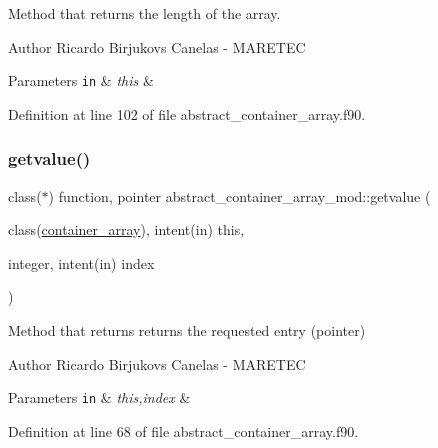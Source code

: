 Method that returns the length of the array. 

\begin{DoxyAuthor}{Author}
Ricardo Birjukovs Canelas -\/ M\+A\+R\+E\+T\+EC 
\end{DoxyAuthor}

\begin{DoxyParams}[1]{Parameters}
\mbox{\tt in}  & {\em this} & \\
\hline
\end{DoxyParams}


Definition at line 102 of file abstract\+\_\+container\+\_\+array.\+f90.

\mbox{\label{namespaceabstract__container__array__mod_a2b3e0aec504d76c73bf7f18158924af4}} 
\subsubsection{\texorpdfstring{getvalue()}{getvalue()}}
{\footnotesize\ttfamily class($\ast$) function, pointer abstract\+\_\+container\+\_\+array\+\_\+mod\+::getvalue (\begin{DoxyParamCaption}\item[{class(\mbox{\hyperlink{structabstract__container__array__mod_1_1container__array}{container\+\_\+array}}), intent(in)}]{this,  }\item[{integer, intent(in)}]{index }\end{DoxyParamCaption})\hspace{0.3cm}{\ttfamily [private]}}



Method that returns returns the requested entry (pointer) 

\begin{DoxyAuthor}{Author}
Ricardo Birjukovs Canelas -\/ M\+A\+R\+E\+T\+EC 
\end{DoxyAuthor}

\begin{DoxyParams}[1]{Parameters}
\mbox{\tt in}  & {\em this,index} & \\
\hline
\end{DoxyParams}


Definition at line 68 of file abstract\+\_\+container\+\_\+array.\+f90.

